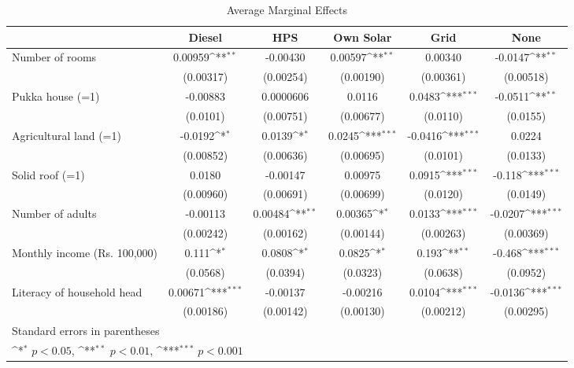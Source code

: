 \begin{table}[htbp]\centering
\def\sym#1{\ifmmode^{#1}\else\(^{#1}\)\fi}
\caption{Average Marginal Effects}
\begin{tabular}{l*{5}{c}}
\toprule
                    &\multicolumn{1}{c}{Diesel}&\multicolumn{1}{c}{HPS}&\multicolumn{1}{c}{Own Solar}&\multicolumn{1}{c}{Grid}&\multicolumn{1}{c}{None}\\
\midrule
Number of rooms     &     0.00959\sym{**} &    -0.00430         &     0.00597\sym{**} &     0.00340         &     -0.0147\sym{**} \\
                    &   (0.00317)         &   (0.00254)         &   (0.00190)         &   (0.00361)         &   (0.00518)         \\
\addlinespace
Pukka house (=1)    &    -0.00883         &   0.0000606         &      0.0116         &      0.0483\sym{***}&     -0.0511\sym{**} \\
                    &    (0.0101)         &   (0.00751)         &   (0.00677)         &    (0.0110)         &    (0.0155)         \\
\addlinespace
Agricultural land (=1)&     -0.0192\sym{*}  &      0.0139\sym{*}  &      0.0245\sym{***}&     -0.0416\sym{***}&      0.0224         \\
                    &   (0.00852)         &   (0.00636)         &   (0.00695)         &    (0.0101)         &    (0.0133)         \\
\addlinespace
Solid roof (=1)     &      0.0180         &    -0.00147         &     0.00975         &      0.0915\sym{***}&      -0.118\sym{***}\\
                    &   (0.00960)         &   (0.00691)         &   (0.00699)         &    (0.0120)         &    (0.0149)         \\
\addlinespace
Number of adults    &    -0.00113         &     0.00484\sym{**} &     0.00365\sym{*}  &      0.0133\sym{***}&     -0.0207\sym{***}\\
                    &   (0.00242)         &   (0.00162)         &   (0.00144)         &   (0.00263)         &   (0.00369)         \\
\addlinespace
Monthly income (Rs. 100,000)&       0.111\sym{*}  &      0.0808\sym{*}  &      0.0825\sym{*}  &       0.193\sym{**} &      -0.468\sym{***}\\
                    &    (0.0568)         &    (0.0394)         &    (0.0323)         &    (0.0638)         &    (0.0952)         \\
\addlinespace
Literacy of household head&     0.00671\sym{***}&    -0.00137         &    -0.00216         &      0.0104\sym{***}&     -0.0136\sym{***}\\
                    &   (0.00186)         &   (0.00142)         &   (0.00130)         &   (0.00212)         &   (0.00295)         \\
\bottomrule
\multicolumn{6}{l}{\footnotesize Standard errors in parentheses}\\
\multicolumn{6}{l}{\footnotesize \sym{*} \(p<0.05\), \sym{**} \(p<0.01\), \sym{***} \(p<0.001\)}\\
\end{tabular}
\end{table}
